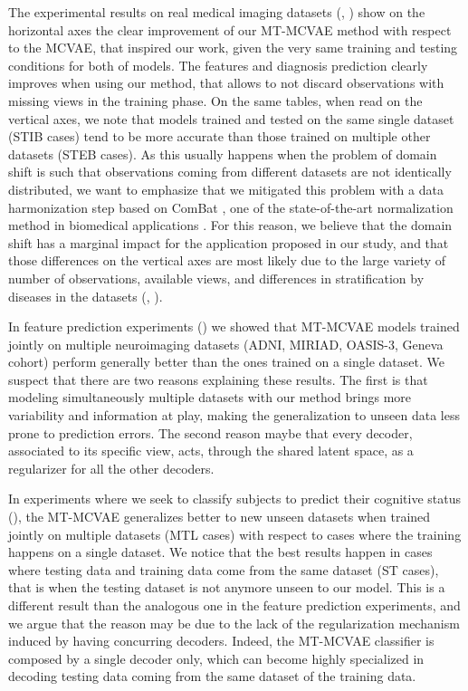The experimental results on real medical imaging datasets (, ) show on the horizontal axes the clear improvement of our MT-MCVAE method with respect to the MCVAE, that inspired our work,
given the very same training and testing conditions for both of models.
The features and diagnosis prediction clearly improves when using our method, that allows to not discard observations with missing views in the training phase.
On the same tables, when read on the vertical axes, we note that models trained and tested on the same single dataset (STIB cases) tend to be more accurate than those trained on multiple other datasets (STEB cases).
As this usually happens when the problem of domain shift is such that observations coming from different datasets are not identically distributed,
we want to emphasize that we mitigated this problem with a data harmonization step based on ComBat \citep{combat},
one of the state-of-the-art normalization method in biomedical applications \citep{Fortin2017, Fortin2018, Orlhac2020}.
For this reason, we believe that the domain shift has a marginal impact for the application proposed in our study,
and that those differences on the vertical axes are most likely due to the large variety of number of observations, available views, and differences in stratification by diseases in the datasets (\cf {}, ).

In feature prediction experiments () we showed that MT-MCVAE models trained jointly on multiple neuroimaging datasets (ADNI, MIRIAD, OASIS-3, Geneva cohort)
perform generally better than the ones trained on a single dataset.
We suspect that there are two reasons explaining these results.
The first is that modeling simultaneously multiple datasets with our method brings more variability and information at play, making the generalization to unseen data less prone to prediction errors.
The second reason maybe that every decoder, associated to its specific view, acts, through the shared latent space, as a regularizer for all the other decoders.

In experiments where we seek to classify subjects to predict their cognitive status (),
the MT-MCVAE generalizes better to new unseen datasets when trained jointly on multiple datasets (MTL cases) with respect to cases where the training happens on a single dataset.
We notice that the best results happen in cases where testing data and training data come from the same dataset (ST cases), that is when the testing dataset is not anymore unseen to our model.
This is a different result than the analogous one in the feature prediction experiments, and we argue that the reason may be due to the lack of the regularization mechanism induced by having concurring decoders.
Indeed, the MT-MCVAE classifier is composed by a single decoder only, which can become highly specialized in decoding testing data coming from the same dataset of the training data.

